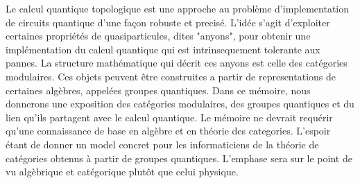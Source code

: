 Le calcul quantique topologique est une approche au problème d'implementation
de circuits quantique d'une façon robuste et precisé.  L'idée s'agit
d'exploiter certaines propriétés de quasiparticules, dites "anyons", pour
obtenir une implémentation du calcul quantique qui est intrinsequement
tolerante aux pannes. La structure mathématique qui décrit ces anyons est celle
des catégories modulaires.  Ces objets peuvent être construites a partir de
representations de certaines algèbres, appelées groupes quantiques.  Dans ce
mémoire, nous donnerons une exposition des catégories modulaires, des groupes
quantiques et du lien qu'ils partagent avec le calcul quantique. Le mémoire ne
devrait requérir qu'une connaissance de base en algèbre et en théorie des
categories. L'espoir étant de donner un model concret pour les informaticiens
de la théorie de catégories obtenus à partir de groupes quantiques.  L'emphase
sera sur le point de vu algèbrique et catégorique plutôt que celui physique.
